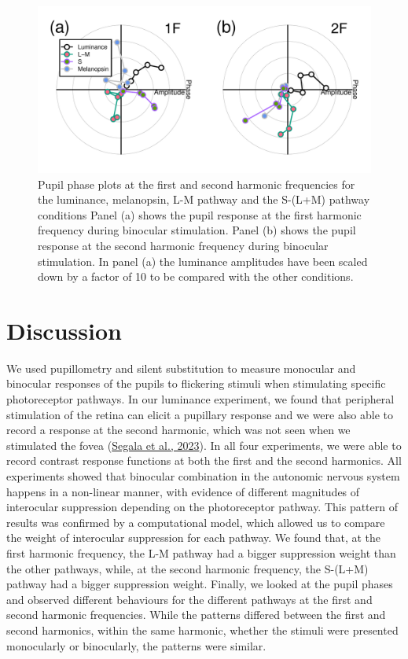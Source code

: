 \documentclass[
]{article}
\begin{document}
\begin{figure}

{\centering \includegraphics{Figures/phaseplots} 

}

\caption{Pupil phase plots at the first and second harmonic frequencies for the luminance, melanopsin, L-M pathway and the S-(L+M) pathway conditions Panel (a) shows the pupil response at the first harmonic frequency during binocular stimulation. Panel (b) shows the pupil response at the second harmonic frequency during binocular stimulation. In panel (a) the luminance amplitudes have been scaled down by a factor of 10 to be compared with the other conditions.}\label{fig:phaseplots}
\end{figure}

\hypertarget{discussion}{%
\section{Discussion}\label{discussion}}

We used pupillometry and silent substitution to measure monocular and binocular responses of the pupils to flickering stimuli when stimulating specific photoreceptor pathways. In our luminance experiment, we found that peripheral stimulation of the retina can elicit a pupillary response and we were also able to record a response at the second harmonic, which was not seen when we stimulated the fovea (\protect\hyperlink{ref-Segala2023}{Segala et al., 2023}). In all four experiments, we were able to record contrast response functions at both the first and the second harmonics. All experiments showed that binocular combination in the autonomic nervous system happens in a non-linear manner, with evidence of different magnitudes of interocular suppression depending on the photoreceptor pathway. This pattern of results was confirmed by a computational model, which allowed us to compare the weight of interocular suppression for each pathway. We found that, at the first harmonic frequency, the L-M pathway had a bigger suppression weight than the other pathways, while, at the second harmonic frequency, the S-(L+M) pathway had a bigger suppression weight. Finally, we looked at the pupil phases and observed different behaviours for the different pathways at the first and second harmonic frequencies. While the patterns differed between the first and second harmonics, within the same harmonic, whether the stimuli were presented monocularly or binocularly, the patterns were similar.
\end{document}
